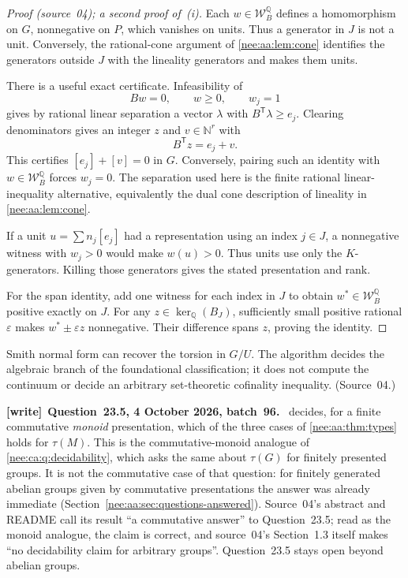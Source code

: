 \documentclass[11pt,letterpaper]{article}
\numberwithin{equation}{section}
\theoremstyle{plain}
\theoremstyle{definition}
\theoremstyle{remark}
\newcommand{\NN}{\mathbb N}
\newcommand{\QQ}{\mathbb Q}
\newenvironment{writenote}[1][]{\par\smallskip\begingroup\small\raggedright
 \setlength{\parindent}{1.25em}\noindent\textbf{[write]}\if\relax\detokenize{#1}\relax\else~\textbf{#1.}\fi\ }%
 {\par\endgroup\smallskip}
\begin{document}
\begin{proof}[Proof (source~04); a second proof of~(i)]
Each $w\in\mathcal W_B^{\QQ}$ defines a homomorphism on $G$, nonnegative on
$P$, which vanishes on units. Thus a generator in $J$ is
not a unit. Conversely, the rational-cone argument of
\cref{nee:aa:lem:cone} identifies the generators outside $J$ with
the lineality generators and makes them units.

There is a useful exact certificate. Infeasibility of
\[
Bw=0,\qquad w\geq0,\qquad w_j=1
\]
gives by rational linear separation a vector $\lambda$ with
$B^{\mathsf T}\lambda\geq e_j$. Clearing denominators gives
an integer $z$ and $v\in\NN^r$ with
\begin{equation}\label{nee:ci:eq:unitcertificate}
B^{\mathsf T}z=e_j+v.
\end{equation}
This certifies $[e_j]+[v]=0$ in $G$. Conversely, pairing
such an identity with $w\in\mathcal W_B^{\QQ}$ forces $w_j=0$.
The separation used here is the finite rational
linear-inequality alternative, equivalently the dual cone
description of lineality in \cref{nee:aa:lem:cone}.

If a unit $u=\sum n_j[e_j]$ had a representation using an
index $j\in J$, a nonnegative witness with $w_j>0$ would
make $w(u)>0$. Thus units use only the $K$-generators.
Killing those generators gives the stated presentation and rank.

For the span identity, add one witness for each index in $J$
to obtain $w^*\in\mathcal W_B^{\QQ}$ positive exactly on $J$. For any
$z\in\ker_\QQ(B_J)$, sufficiently small positive rational
$\varepsilon$ makes $w^*\pm\varepsilon z$ nonnegative.
Their difference spans $z$, proving the identity.
\end{proof}

Smith normal form can recover the torsion in $G/U$.
The algorithm decides the algebraic branch of the foundational
classification; it does not compute the continuum or decide an
arbitrary set-theoretic cofinality inequality. (Source~04.)

\begin{writenote}[Question~23.5, 4 October 2026, batch~96]
 decides, for a finite commutative \emph{monoid} presentation, which of the three cases of \cref{nee:aa:thm:types} holds for $\tau(M)$. This is the commutative-monoid analogue of \cref{nee:ca:q:decidability}, which asks the same about $\tau(G)$ for finitely presented groups. It is not the commutative case of that question: for finitely generated abelian groups given by commutative presentations the answer was already immediate (Section~\ref{nee:aa:sec:questions-answered}). Source~04's abstract and README call its result ``a commutative answer'' to Question~23.5; read as the monoid analogue, the claim is correct, and source~04's Section~1.3 itself makes ``no decidability claim for arbitrary groups''. Question~23.5 stays open beyond abelian groups.
\end{writenote}
\end{document}
